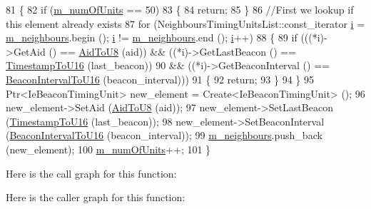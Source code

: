 \begin{DoxyCode}
81 \{
82   \textcolor{keywordflow}{if} (\hyperlink{classns3_1_1dot11s_1_1IeBeaconTiming_a71584e499b5c7ff1679953f8e7c58cdc}{m\_numOfUnits} == 50)
83     \{
84       \textcolor{keywordflow}{return};
85     \}
86   \textcolor{comment}{//First we lookup if this element already exists}
87   \textcolor{keywordflow}{for} (NeighboursTimingUnitsList::const\_iterator \hyperlink{bernuolliDistribution_8m_a6f6ccfcf58b31cb6412107d9d5281426}{i} = \hyperlink{classns3_1_1dot11s_1_1IeBeaconTiming_acde5a981cb6e4d2afb319d6c879408b9}{m\_neighbours}.begin (); 
      \hyperlink{bernuolliDistribution_8m_a6f6ccfcf58b31cb6412107d9d5281426}{i} != \hyperlink{classns3_1_1dot11s_1_1IeBeaconTiming_acde5a981cb6e4d2afb319d6c879408b9}{m\_neighbours}.end (); \hyperlink{bernuolliDistribution_8m_a6f6ccfcf58b31cb6412107d9d5281426}{i}++)
88     \{
89       \textcolor{keywordflow}{if} (((*i)->GetAid () == \hyperlink{classns3_1_1dot11s_1_1IeBeaconTiming_ab9feab28d4b88a5f7ef99b981b6025b3}{AidToU8} (aid)) && ((*i)->GetLastBeacon () == 
      \hyperlink{classns3_1_1dot11s_1_1IeBeaconTiming_adbd32edc0693151e4a303edc46810baf}{TimestampToU16} (last\_beacon))
90           && ((*i)->GetBeaconInterval () == \hyperlink{classns3_1_1dot11s_1_1IeBeaconTiming_a3786fc43fe97f2692a3c040440e55a3d}{BeaconIntervalToU16} (beacon\_interval)))
91         \{
92           \textcolor{keywordflow}{return};
93         \}
94     \}
95   Ptr<IeBeaconTimingUnit> new\_element = Create<IeBeaconTimingUnit> ();
96   new\_element->SetAid (\hyperlink{classns3_1_1dot11s_1_1IeBeaconTiming_ab9feab28d4b88a5f7ef99b981b6025b3}{AidToU8} (aid));
97   new\_element->SetLastBeacon (\hyperlink{classns3_1_1dot11s_1_1IeBeaconTiming_adbd32edc0693151e4a303edc46810baf}{TimestampToU16} (last\_beacon));
98   new\_element->SetBeaconInterval (\hyperlink{classns3_1_1dot11s_1_1IeBeaconTiming_a3786fc43fe97f2692a3c040440e55a3d}{BeaconIntervalToU16} (beacon\_interval));
99   \hyperlink{classns3_1_1dot11s_1_1IeBeaconTiming_acde5a981cb6e4d2afb319d6c879408b9}{m\_neighbours}.push\_back (new\_element);
100   \hyperlink{classns3_1_1dot11s_1_1IeBeaconTiming_a71584e499b5c7ff1679953f8e7c58cdc}{m\_numOfUnits}++;
101 \}
\end{DoxyCode}


Here is the call graph for this function\+:




Here is the caller graph for this function\+:


